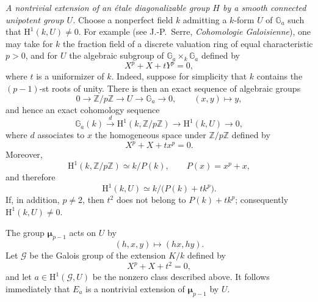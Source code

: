 \smallskip
\noindent
\emph{ A nontrivial extension of an étale diagonalizable group
\(H\) by a smooth connected unipotent group \(U\).}
Choose a nonperfect field \(k\) admitting a \(k\)-form \(U\) of
\(\mathbb G_a\) such that \(\mathrm H^1(k,U)\ne0\).  For example
(see J.-P.\ Serre, \emph{Cohomologie Galoisienne}), one may take
for \(k\) the fraction field of a discrete valuation ring of
equal characteristic \(p>0\), and for \(U\) the algebraic
subgroup of \(\mathbb G_a\times_k\mathbb G_a\) defined by
\[
  X^p+X+tY^p=0,
\]
where \(t\) is a uniformizer of \(k\).  Indeed, suppose for
simplicity that \(k\) contains the \((p-1)\)-st roots of unity.
There is then an exact sequence of algebraic groups
\[
  0\longrightarrow\mathbb Z/p\mathbb Z
   \longrightarrow U
   \longrightarrow\mathbb G_a
   \longrightarrow0,
  \qquad
  (x,y)\longmapsto y,
\]
and hence an exact cohomology sequence
\[
  \mathbb G_a(k)\xrightarrow{\,d\,}
  \mathrm H^1(k,\mathbb Z/p\mathbb Z)
  \longrightarrow\mathrm H^1(k,U)
  \longrightarrow0,
\]
where \(d\) associates to \(x\) the homogeneous space under
\(\mathbb Z/p\mathbb Z\) defined by
\[
  X^p+X+tx^p=0.
\]
Moreover,
\[
  \mathrm H^1(k,\mathbb Z/p\mathbb Z)\simeq k/P(k),
  \qquad P(x)=x^p+x,
\]
and therefore
\[
  \mathrm H^1(k,U)\simeq k/\bigl(P(k)+tk^p\bigr).
\]
If, in addition, \(p\ne2\), then \(t^2\) does not belong to
\(P(k)+tk^p\); consequently \(\mathrm H^1(k,U)\ne0\).

The group \(\boldsymbol\mu_{p-1}\) acts on \(U\) by
\[
  (h,x,y)\longmapsto(hx,hy).
\]
Let \(\mathscr G\) be the Galois group of the extension \(K/k\)
defined by
\[
  X^p+X+t^2=0,
\]
and let \(a\in\mathrm H^1(\mathscr G,U)\) be the nonzero class
described above.  It follows immediately that \(E_a\) is a
nontrivial extension of \(\boldsymbol\mu_{p-1}\) by \(U\).

